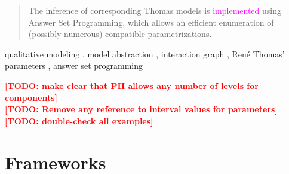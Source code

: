 \documentclass[preprint]{elsarticle}
\newcommand{\todo}[1]{\textcolor{red}{\textbf{[TODO: #1]}}}
\def\modLP#1{\textcolor{magenta}{#1}}
\begin{document}
\begin{frontmatter}
\begin{abstract}
The inference of corresponding Thomas models is \modLP{implemented} using Answer Set Programming,
which allows an efficient enumeration of (possibly numerous) compatible parametrizations.
\end{abstract}

\begin{keyword}
qualitative modeling \sep
model abstraction \sep
interaction graph \sep
René Thomas' parameters \sep
answer set programming
\end{keyword}

\end{frontmatter}


\noindent
\todo{make clear that PH allows any number of levels for components}\\
\todo{Remove any reference to interval values for parameters}\\
\todo{double-check all examples}



\section{Frameworks}\label{sec:frameworks}













%
\end{document}
